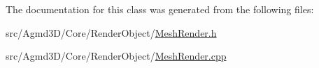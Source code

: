 The documentation for this class was generated from the following files\+:\begin{DoxyCompactItemize}
\item 
src/\+Agmd3\+D/\+Core/\+Render\+Object/\hyperlink{_mesh_render_8h}{Mesh\+Render.\+h}\item 
src/\+Agmd3\+D/\+Core/\+Render\+Object/\hyperlink{_mesh_render_8cpp}{Mesh\+Render.\+cpp}\end{DoxyCompactItemize}
